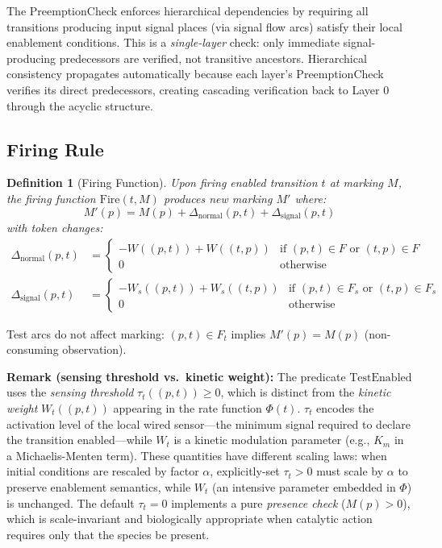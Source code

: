 \documentclass[10pt,letterpaper]{article}
\newtheorem{definition}{Definition}
\begin{document}
The PreemptionCheck enforces hierarchical dependencies by requiring all transitions producing input signal places (via signal flow arcs) satisfy their local enablement conditions. This is a \textit{single-layer} check: only immediate signal-producing predecessors are verified, not transitive ancestors. Hierarchical consistency propagates automatically because each layer's PreemptionCheck verifies its direct predecessors, creating cascading verification back to Layer 0 through the acyclic structure.

\subsection{Firing Rule}

\begin{definition}[Firing Function]
Upon firing enabled transition $t$ at marking $M$, the firing function $\text{Fire}(t,M)$ produces new marking $M'$ where:
\begin{equation}
M'(p) = M(p) + \Delta_{\text{normal}}(p,t) + \Delta_{\text{signal}}(p,t)
\end{equation}
with token changes:
\begin{align}
\Delta_{\text{normal}}(p,t) &= \begin{cases}
-W((p,t)) + W((t,p)) & \text{if } (p,t) \in F \text{ or } (t,p) \in F \\
0 & \text{otherwise}
\end{cases} \\
\Delta_{\text{signal}}(p,t) &= \begin{cases}
-W_s((p,t)) + W_s((t,p)) & \text{if } (p,t) \in F_s \text{ or } (t,p) \in F_s \\
0 & \text{otherwise}
\end{cases}
\end{align}
\end{definition}

Test arcs do not affect marking: $(p,t) \in F_t$ implies $M'(p) = M(p)$ (non-consuming observation).

\textbf{Remark (sensing threshold vs.\ kinetic weight):} The predicate $\text{TestEnabled}$ uses the \emph{sensing threshold} $\tau_t((p,t)) \geq 0$, which is distinct from the \emph{kinetic weight} $W_t((p,t))$ appearing in the rate function $\Phi(t)$. $\tau_t$ encodes the activation level of the local wired sensor---the minimum signal required to declare the transition enabled---while $W_t$ is a kinetic modulation parameter (e.g., $K_m$ in a Michaelis-Menten term). These quantities have different scaling laws: when initial conditions are rescaled by factor $\alpha$, explicitly-set $\tau_t > 0$ must scale by $\alpha$ to preserve enablement semantics, while $W_t$ (an intensive parameter embedded in $\Phi$) is unchanged. The default $\tau_t = 0$ implements a pure \emph{presence check} ($M(p) > 0$), which is scale-invariant and biologically appropriate when catalytic action requires only that the species be present.
\end{document}
